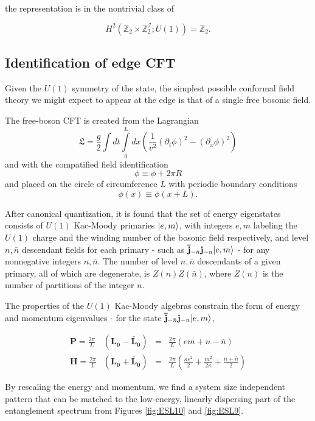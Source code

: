 the representation is in the nontrivial class of 

$$
H^2(\mathbb{Z}_2 \times \mathbb{Z}_2^{\mathcal{I}}; U(1)) = \mathbb{Z}_2.
$$


\newcommand{\uL}{\mathbf{L_0}}
\newcommand{\bL}{\mathbf{\bar{L}_0}}

\subsection{Identification of edge CFT}
\label{sec:CFT}

Given the $U(1)$ symmetry of the state, the simplest possible 
conformal field theory we might expect to appear at the edge is that 
of a single free bosonic field. 

The free-boson CFT is created from the Lagrangian 
$$ \mathfrak{L} = \frac{g}{2}\int dt \int\limits_0^L dx ( \frac{1}{v^2}(\partial_t \phi)^2 - (\partial_x \phi)^2)$$
and with the compatified field identification
$$ \phi \equiv \phi + 2\pi R$$
and placed on the circle of circumference $L$ with periodic boundary conditions
$$ \phi(x) \equiv \phi(x+L).$$

After canonical quantization, it is found that the set of energy 
eigenstates consists of $U(1)$ Kac-Moody primaries $\vert e, m \rangle$, with 
integers $e, m$ labeling the $U(1)$ charge and the winding number of 
the bosonic field respectively, and level $n, \bar{n}$ descendant 
fields for each primary - such as  $\mathbf{\bar{j}}_{-\bar{n}} 
\mathbf{j}_{-n} \vert e, m \rangle$ - for any nonnegative integers $n, 
\bar{n}$. The number of level $n, \bar{n}$ descendants of a given 
primary, all of which are degenerate, is $Z(n) Z(\bar{n})$, where 
$Z(n)$ is the number of partitions of the integer $n$.

The properties of the $U(1)$ Kac-Moody algebras constrain the form of 
energy and momentum eigenvalues - for the state 
$\mathbf{\bar{j}}_{-\bar{n}} \mathbf{j}_{-n} \vert e, m \rangle$, 

\begin{align*}
	\mathbf{P} =\frac{2\pi}{L}&(\uL-\bL) 
	&=& \frac{2\pi}{L}(em + n - \bar{n}) \\
	\mathbf{H} = \frac{2\pi}{L}&(\uL+\bL) 
	&=& \frac{2\pi}{L}(\frac{\kappa e^2}{2} + \frac{m^2}{2 \kappa} + \frac{n + \bar{n}}{2}) %
\end{align*}

By rescaling the energy and momentum, we find a system size 
independent pattern that can be matched to the low-energy, linearly 
dispersing part of the entanglement spectrum from Figures 
\ref{fig:ESL10} and \ref{fig:ESL9}. 

